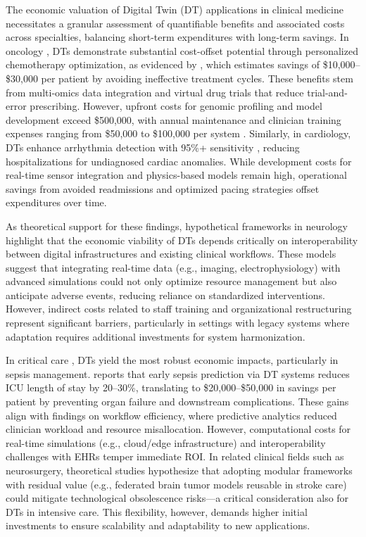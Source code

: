 \documentclass[10pt,a4paper]{article}
\begin{document}
The economic valuation of Digital Twin (DT) applications in clinical medicine necessitates a granular assessment of quantifiable benefits and associated costs across specialties, balancing short-term expenditures with long-term savings. In oncology , DTs demonstrate substantial cost-offset potential through personalized chemotherapy optimization, as evidenced by \cite{Wang2025}, which estimates savings of \$10,000–\$30,000 per patient by avoiding ineffective treatment cycles. These benefits stem from multi-omics data integration and virtual drug trials that reduce trial-and-error prescribing. However, upfront costs for genomic profiling and model development exceed \$500,000, with annual maintenance and clinician training expenses ranging from \$50,000 to \$100,000 per system \cite{Wang2025}. Similarly, in cardiology, DTs enhance arrhythmia detection with 95\%+ sensitivity \cite{Ahmed2023}, reducing hospitalizations for undiagnosed cardiac anomalies. While development costs for real-time sensor integration and physics-based models remain high, operational savings from avoided readmissions and optimized pacing strategies offset expenditures over time.

As theoretical support for these findings, hypothetical frameworks in neurology highlight that the economic viability of DTs depends critically on interoperability between digital infrastructures and existing clinical workflows. These models suggest that integrating real-time data (e.g., imaging, electrophysiology) with advanced simulations could not only optimize resource management but also anticipate adverse events, reducing reliance on standardized interventions. However, indirect costs related to staff training and organizational restructuring represent significant barriers, particularly in settings with legacy systems where adaptation requires additional investments for system harmonization.

In critical care , DTs yield the most robust economic impacts, particularly in sepsis management. \cite{Mascret2024} reports that early sepsis prediction via DT systems reduces ICU length of stay by 20–30\%, translating to \$20,000–\$50,000 in savings per patient by preventing organ failure and downstream complications. These gains align with \cite{Boverhof2024} findings on workflow efficiency, where predictive analytics reduced clinician workload and resource misallocation. However, computational costs for real-time simulations (e.g., cloud/edge infrastructure) and interoperability challenges with EHRs temper immediate ROI. In related clinical fields such as neurosurgery, theoretical studies hypothesize that adopting modular frameworks with residual value (e.g., federated brain tumor models reusable in stroke care) could mitigate technological obsolescence risks—a critical consideration also for DTs in intensive care. This flexibility, however, demands higher initial investments to ensure scalability and adaptability to new applications.
\end{document}
